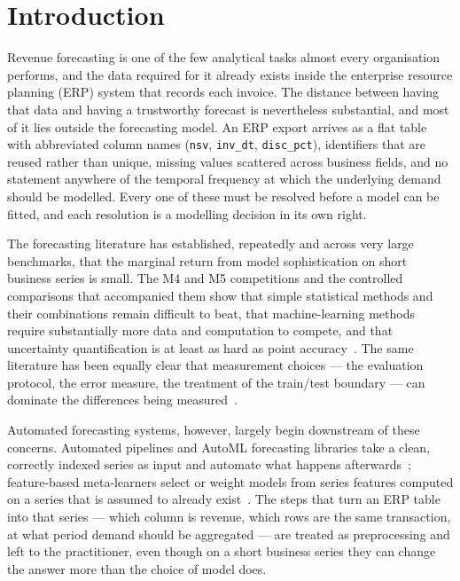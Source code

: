 \documentclass[conference]{IEEEtran}
\begin{document}
\section{Introduction}

Revenue forecasting is one of the few analytical tasks almost every
organisation performs, and the data required for it already exists inside the
enterprise resource planning (ERP) system that records each invoice. The
distance between having that data and having a trustworthy forecast is
nevertheless substantial, and most of it lies outside the forecasting model.
An ERP export arrives as a flat table with abbreviated column names
(\texttt{nsv}, \texttt{inv\_dt}, \texttt{disc\_pct}), identifiers that are
reused rather than unique, missing values scattered across business fields,
and no statement anywhere of the temporal frequency at which the underlying
demand should be modelled. Every one of these must be resolved before a model
can be fitted, and each resolution is a modelling decision in its own right.

The forecasting literature has established, repeatedly and across very large
benchmarks, that the marginal return from model sophistication on short
business series is small. The M4 and M5 competitions and the controlled
comparisons that accompanied them show that simple statistical methods and
their combinations remain difficult to beat, that machine-learning methods
require substantially more data and computation to compete, and that
uncertainty quantification is at least as hard as point
accuracy~\cite{makridakis2018statml,makridakis2022m5acc,makridakis2022m5unc,spiliotis2022sku}.
The same literature has been equally clear that measurement choices --- the
evaluation protocol, the error measure, the treatment of the train/test
boundary --- can dominate the differences being
measured~\cite{tashman2000outofsample,bergmeir2012cv,hyndman2006accuracy,kolassa2020bestpoint}.

Automated forecasting systems, however, largely begin downstream of these
concerns. Automated pipelines and AutoML forecasting libraries take a clean,
correctly indexed series as input and automate what happens
afterwards~\cite{meisenbacher2022pipelines,shchur2023autogluon}; feature-based
meta-learners select or weight models from series features computed on a
series that is assumed to already
exist~\cite{monteromanso2020fforma,talagala2023fforms}. The steps that turn an
ERP table into that series --- which column is revenue, which rows are the
same transaction, at what period demand should be aggregated --- are treated
as preprocessing and left to the practitioner, even though on a short business
series they can change the answer more than the choice of model does.
\end{document}
